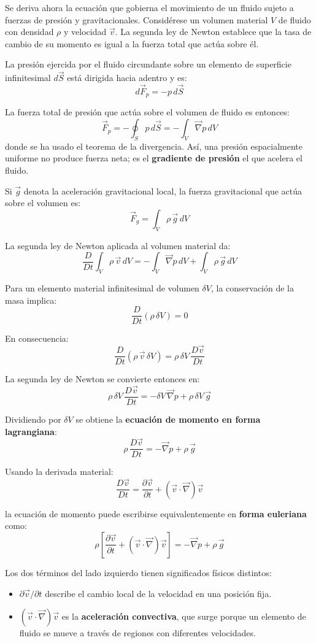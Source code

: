 Se deriva ahora la ecuación que gobierna el movimiento de un fluido sujeto a fuerzas de presión y gravitacionales. Considérese un volumen material $V$ de fluido con densidad $\rho$ y velocidad $\vec{v}$. La segunda ley de Newton establece que la tasa de cambio de su momento es igual a la fuerza total que actúa sobre él.

La presión ejercida por el fluido circundante sobre un elemento de superficie infinitesimal $d\vec{S}$ está dirigida hacia adentro y es:
$$
d\vec{F}_p = -p\, d\vec{S}
$$

La fuerza total de presión que actúa sobre el volumen de fluido es entonces:
$$
\vec{F}_p = -\oint_S p\, d\vec{S} = -\int_V \vec{\nabla} p\, dV
$$
donde se ha usado el teorema de la divergencia. Así, una presión espacialmente uniforme no produce fuerza neta; es el \textbf{gradiente de presión} el que acelera el fluido.

Si $\vec{g}$ denota la aceleración gravitacional local, la fuerza gravitacional que actúa sobre el volumen es:
$$
\vec{F}_g = \int_V \rho\,\vec{g}\, dV
$$

La segunda ley de Newton aplicada al volumen material da:
$$
\frac{D}{Dt}\int_V \rho\,\vec{v}\, dV = -\int_V \vec{\nabla} p\, dV + \int_V \rho\,\vec{g}\, dV
$$

Para un elemento material infinitesimal de volumen $\delta V$, la conservación de la masa implica:
$$
\frac{D}{Dt}(\rho\,\delta V) = 0
$$

En consecuencia:
$$
\frac{D}{Dt}(\rho\,\vec{v}\,\delta V) = \rho\,\delta V\,\frac{D\vec{v}}{Dt}
$$

La segunda ley de Newton se convierte entonces en:
$$
\rho\,\delta V\,\frac{D\vec{v}}{Dt} = -\delta V\,\vec{\nabla} p + \rho\,\delta V\,\vec{g}
$$

Dividiendo por $\delta V$ se obtiene la \textbf{ecuación de momento en forma lagrangiana}:
$$
\boxed{\rho\,\frac{D\vec{v}}{Dt} = -\vec{\nabla} p + \rho\,\vec{g}}
$$

Usando la derivada material:
$$
\frac{D\vec{v}}{Dt} = \frac{\partial \vec{v}}{\partial t} + (\vec{v}\cdot\vec{\nabla})\vec{v}
$$

la ecuación de momento puede escribirse equivalentemente en \textbf{forma euleriana} como:
$$
\boxed{\rho\left[\frac{\partial \vec{v}}{\partial t} + (\vec{v}\cdot\vec{\nabla})\vec{v}\right] = -\vec{\nabla} p + \rho\,\vec{g}}
$$

Los dos términos del lado izquierdo tienen significados físicos distintos:
\begin{itemize}
    \item $\partial\vec{v}/\partial t$ describe el cambio local de la velocidad en una posición fija.
    \item $(\vec{v}\cdot\vec{\nabla})\vec{v}$ es la \textbf{aceleración convectiva}, que surge porque un elemento de fluido se mueve a través de regiones con diferentes velocidades.
\end{itemize}

